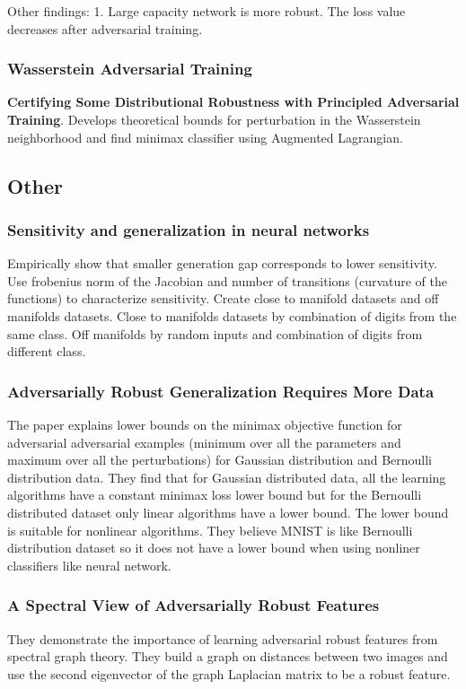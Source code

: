 \documentclass[10pt,a4paper]{article}
\begin{document}
Other findings: 1. Large capacity network is more robust. The loss value decreases after adversarial training.
\subsubsection{Wasserstein Adversarial Training}
\textbf{Certifying Some Distributional Robustness with Principled Adversarial Training\cite{sinha2018certifying}}. Develops theoretical bounds for perturbation in the Wasserstein neighborhood and find minimax classifier using Augmented Lagrangian.
\subsection{Other}
\subsubsection{Sensitivity and generalization in neural networks\cite{novak2018sensitivity}}
Empirically show that smaller generation gap corresponds to lower sensitivity. Use frobenius norm of the Jacobian and number of transitions (curvature of the functions) to characterize sensitivity. Create close to manifold datasets and off manifolds datasets. Close to manifolds datasets by combination of digits from the same class. Off manifolds by random inputs and combination of digits from different class.
\subsubsection{Adversarially Robust Generalization Requires More Data \cite{schmidt2018adversarially}}
The paper explains lower bounds on the minimax objective function for adversarial adversarial examples (minimum over all the parameters and maximum  over all the perturbations) for Gaussian distribution and Bernoulli distribution data. They find that for Gaussian distributed data, all the learning algorithms have a constant minimax loss lower bound but for the Bernoulli distributed dataset only linear algorithms have a lower bound. The lower bound is suitable for nonlinear algorithms. They believe MNIST is like Bernoulli distribution dataset so it does not have a lower bound when using nonliner classifiers like neural network.
\subsubsection{A Spectral View of Adversarially Robust Features \cite{garg2018spectral}}
They demonstrate the importance of learning adversarial robust features from spectral graph theory. They build a graph on distances between two images and use the second eigenvector of the graph Laplacian matrix to be a robust feature.
\end{document}
